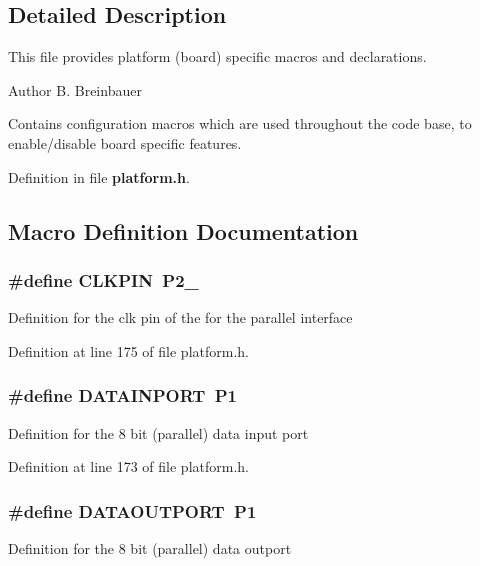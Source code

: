 \subsection{Detailed Description}
This file provides platform (board) specific macros and declarations. \begin{DoxyAuthor}{Author}
B. Breinbauer
\end{DoxyAuthor}
Contains configuration macros which are used throughout the code base, to enable/disable board specific features. 

Definition in file {\bf platform.\-h}.



\subsection{Macro Definition Documentation}
\subsubsection[{C\-L\-K\-P\-I\-N}]{\setlength{\rightskip}{0pt plus 5cm}\#define C\-L\-K\-P\-I\-N~P2\-\_}\label{platform_8h_a377f8bedbca96a219ff5a78bf54f8e1e}
Definition for the clk pin of the for the parallel interface 

Definition at line 175 of file platform.\-h.

\subsubsection[{D\-A\-T\-A\-I\-N\-P\-O\-R\-T}]{\setlength{\rightskip}{0pt plus 5cm}\#define D\-A\-T\-A\-I\-N\-P\-O\-R\-T~P1}\label{platform_8h_a2c3ecf3627d7fc3f40926e983ee16b2a}
Definition for the 8 bit (parallel) data input port 

Definition at line 173 of file platform.\-h.

\subsubsection[{D\-A\-T\-A\-O\-U\-T\-P\-O\-R\-T}]{\setlength{\rightskip}{0pt plus 5cm}\#define D\-A\-T\-A\-O\-U\-T\-P\-O\-R\-T~P1}\label{platform_8h_ad8c9bdaf4b39e7a77066c55b7a25a5a5}
Definition for the 8 bit (parallel) data outport 

